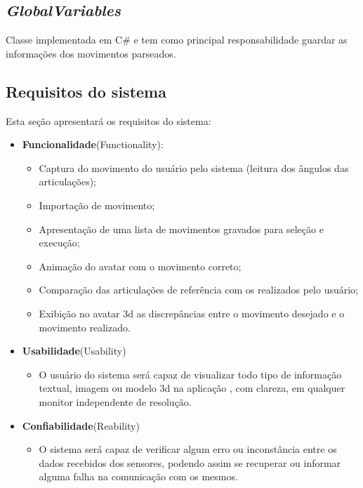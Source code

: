   \subsection{\textit{GlobalVariables}}\label{sub:gvariable}
    Classe implementada em C\# e tem como principal responsabilidade guardar as informações dos movimentos parseados.


  \subsection{Requisitos do sistema}\label{sec:requisitosSistema}
   Esta seção apresentará os requisitos do sistema:
   \begin{itemize}
   \item \textbf{Funcionalidade}(Functionality):
     \begin{itemize}
     \item Captura do movimento do usuário pelo sistema (leitura dos ângulos das articulações);
     \item Importação de movimento;
     \item Apresentação de uma lista de movimentos gravados para seleção e execução;
     \item Animação do avatar com o movimento correto;
     \item Comparação das articulações de referência com os realizados pelo usuário;
     \item Exibição no avatar 3d as discrepâncias entre o movimento desejado e o movimento realizado.
     \end{itemize}
   \item \textbf{Usabilidade}(Usability)
     \begin{itemize}
     \item O usuário do sistema será capaz de visualizar todo tipo de informação
      textual, imagem ou modelo 3d na aplicação , com clareza, em qualquer
     monitor independente de resolução.
     \end{itemize}
  \item \textbf{Confiabilidade}(Reability)
     \begin{itemize}
     \item O sistema será capaz de verificar algum erro ou inconstância entre os
      dados recebidos dos sensores, podendo assim se recuperar ou informar
     alguma falha na comunicação com os mesmos.

\end{itemize}
\end{itemize}

